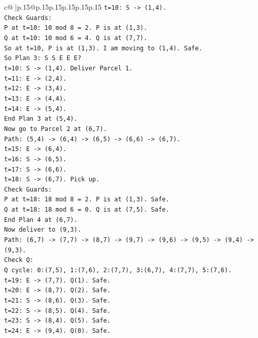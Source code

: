 \documentclass{article}
\begin{document}
{\begin{supertabular}{c@{$\;$}|p{.15\linewidth}@{}p{.15\linewidth}p{.15\linewidth}p{.15\linewidth}p{.15\linewidth}p{.15\linewidth}}
{{{\texttt{t=10: S {-}> (1,4).} \\
\texttt{Check Guards:} \\
\texttt{P at t=10: 10 mod 8 = 2. P is at (1,3).} \\
\texttt{Q at t=10: 10 mod 6 = 4. Q is at (7,7).} \\
\texttt{So at t=10, P is at (1,3). I am moving to (1,4). Safe.} \\
\texttt{So Plan 3: S S E E E?} \\
\texttt{t=10: S {-}> (1,4). Deliver Parcel 1.} \\
\texttt{t=11: E {-}> (2,4).} \\
\texttt{t=12: E {-}> (3,4).} \\
\texttt{t=13: E {-}> (4,4).} \\
\texttt{t=14: E {-}> (5,4).} \\
\texttt{End Plan 3 at (5,4).} \\
\texttt{Now go to Parcel 2 at (6,7).} \\
\texttt{Path: (5,4) {-}> (6,4) {-}> (6,5) {-}> (6,6) {-}> (6,7).} \\
\texttt{t=15: E {-}> (6,4).} \\
\texttt{t=16: S {-}> (6,5).} \\
\texttt{t=17: S {-}> (6,6).} \\
\texttt{t=18: S {-}> (6,7). Pick up.} \\
\texttt{Check Guards:} \\
\texttt{P at t=18: 18 mod 8 = 2. P is at (1,3). Safe.} \\
\texttt{Q at t=18: 18 mod 6 = 0. Q is at (7,5). Safe.} \\
\texttt{End Plan 4 at (6,7).} \\
\texttt{Now deliver to (9,3).} \\
\texttt{Path: (6,7) {-}> (7,7) {-}> (8,7) {-}> (9,7) {-}> (9,6) {-}> (9,5) {-}> (9,4) {-}> (9,3).} \\
\texttt{Check Q:} \\
\texttt{Q cycle: 0:(7,5), 1:(7,6), 2:(7,7), 3:(6,7), 4:(7,7), 5:(7,6).} \\
\texttt{t=19: E {-}> (7,7). Q(1). Safe.} \\
\texttt{t=20: E {-}> (8,7). Q(2). Safe.} \\
\texttt{t=21: S {-}> (8,6). Q(3). Safe.} \\
\texttt{t=22: S {-}> (8,5). Q(4). Safe.} \\
\texttt{t=23: S {-}> (8,4). Q(5). Safe.} \\
\texttt{t=24: E {-}> (9,4). Q(0). Safe.} \\
}}}
\end{supertabular}}
\end{document}
